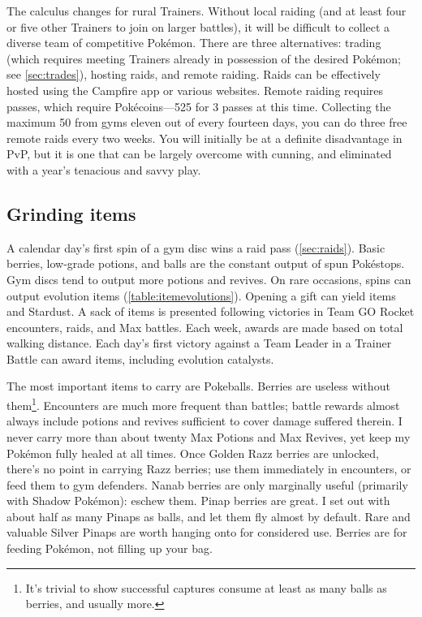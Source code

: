 The calculus changes for rural Trainers.
Without local raiding (and at least four or five other Trainers to join on larger battles),
  it will be difficult to collect a diverse team of competitive Pokémon.
There are three alternatives: trading (which requires meeting Trainers already in possession of the desired Pokémon;
  see \autoref{sec:trades}), hosting raids, and remote raiding.
Raids can be effectively hosted using the Campfire app or various websites.
Remote raiding requires passes, which require Pokécoins---525 for 3 passes at this time.
Collecting the maximum 50 from gyms eleven out of every fourteen days, you can do
  three free remote raids every two weeks.
You will initially be at a definite disadvantage in PvP, but it is one that can
  be largely overcome with cunning, and eliminated with a year's tenacious
  and savvy play.

\subsection{Grinding items\label{subsec:grinditems}}
A calendar day's first spin of a gym disc wins a raid pass (\autoref{sec:raids}).
Basic berries, low-grade potions, and balls are the constant output of spun Pokéstops.
Gym discs tend to output more potions and revives.
On rare occasions, spins can output evolution items (\autoref{table:itemevolutions}).
Opening a gift can yield items and Stardust.
A sack of items is presented following victories in Team GO Rocket encounters, raids, and Max battles.
Each week, awards are made based on total walking distance.
Each day's first victory against a Team Leader in a Trainer Battle can award items,
  including evolution catalysts.

The most important items to carry are Pokeballs.
Berries are useless without them\footnote{It's trivial to show successful
 captures consume at least as many balls as berries, and usually more.}.
Encounters are much more frequent than battles; battle rewards almost always
 include potions and revives sufficient to cover damage suffered therein.
I never carry more than about twenty Max Potions and Max Revives, yet keep my Pokémon fully healed at all times.
Once Golden Razz berries are unlocked, there's no point in carrying Razz berries;
  use them immediately in encounters, or feed them to gym defenders.
Nanab berries are only marginally useful (primarily with Shadow Pokémon): eschew them.
Pinap berries are great.
I set out with about half as many Pinaps as balls, and let them fly almost by default.
Rare and valuable Silver Pinaps are worth hanging onto for considered use.
Berries are for feeding Pokémon, not filling up your bag.


